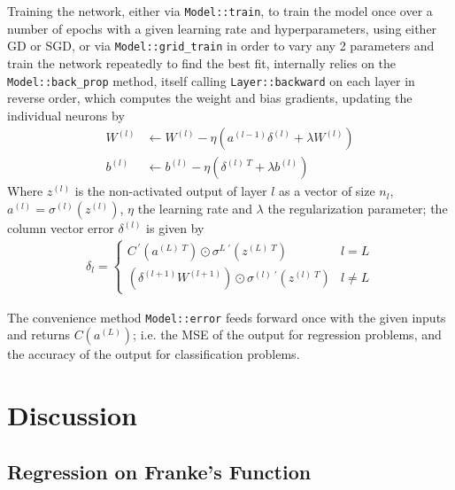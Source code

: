 \documentclass[aps,reprint,superscriptaddress,nofootinbib]{revtex4-2}
\begin{document}
Training the network, either via \texttt{Model::\linebreak[0]train}, to train the model once over a number of epochs with a given learning rate and hyperparameters, using either GD or SGD, or via \texttt{Model::\linebreak[0]grid\_\linebreak[0]train} in order to vary any 2 parameters and train the network repeatedly to find the best fit, internally relies on the \texttt{Model::\linebreak[0]back\_\linebreak[0]prop} method, itself calling \texttt{Layer::\linebreak[0]backward} on each layer in reverse order, which computes the weight and bias gradients, updating the individual neurons by
\begin{align*}
    W^{(l)} &\xleftarrow{} W^{(l)} - \eta (a^{(l-1)} \delta^{(l)} + \lambda W^{(l)} )
    \\
    b^{(l)} &\xleftarrow{} b^{(l)} - \eta (\delta^{(l)\;T} + \lambda b^{(l)} )
\end{align*}
Where \(z^{(l)}\) is the non-activated output of layer \(l\) as a vector of size \(n_{l}\), \(a^{(l)} = \sigma^{(l)} (z^{(l)} )\), \(\eta\) the learning rate and \(\lambda\) the regularization parameter; the column vector error \(\delta^{(l)}\) is given by
\begin{align*}
    \delta_l = 
    \begin{cases}
        C^{\,\prime} (a^{(L)\;T} ) \odot \sigma^{L\;\prime} (z^{(L)\;T} ) &l = L
        \\
         (\delta^{(l+1)} W^{(l+1)} ) \odot \sigma^{(l)\;\prime} (z^{(l)\;T} ) &l \neq L
    \end{cases}
\end{align*}

The convenience method \texttt{Model::\linebreak[0]error} feeds forward once with the given inputs and returns \(C (a^{(L)} )\); i.e. the MSE of the output for regression problems, and the accuracy of the output for classification problems.

\section*{Discussion}

\subsection*{Regression on Franke's Function}
\end{document}
